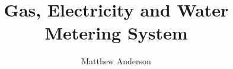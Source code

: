 \documentclass{report}
\begin{document}
\title{Gas, Electricity and Water Metering System}
\author{Matthew Anderson}
\maketitle
\tableofcontents






\end{document}
